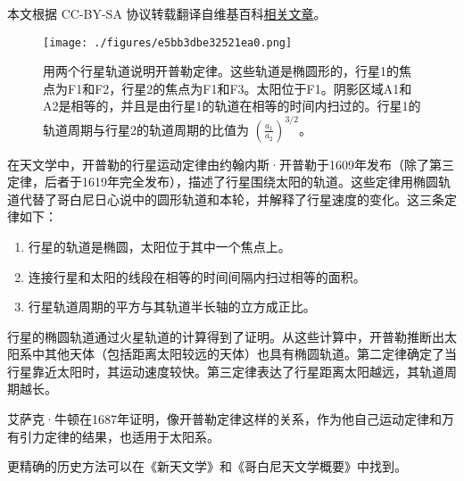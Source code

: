 
本文根据 CC-BY-SA 协议转载翻译自维基百科\href{https://en.wikipedia.org/wiki/Kepler\%27s_laws_of_planetary_motion}{相关文章}。

\begin{figure}[ht]
\centering
\texttt{[image: ./figures/e5bb3dbe32521ea0.png]}
\caption{用两个行星轨道说明开普勒定律。这些轨道是椭圆形的，行星1的焦点为F1和F2，行星2的焦点为F1和F3。太阳位于F1。阴影区域A1和A2是相等的，并且是由行星1的轨道在相等的时间内扫过的。行星1的轨道周期与行星2的轨道周期的比值为 \(\left(\frac{a_1}{a_2}\right)^{3/2}\)。} \label{fig_KPL_1}
\end{figure}
在天文学中，开普勒的行星运动定律由约翰内斯·开普勒于1609年发布（除了第三定律，后者于1619年完全发布），描述了行星围绕太阳的轨道。这些定律用椭圆轨道代替了哥白尼日心说中的圆形轨道和本轮，并解释了行星速度的变化。这三条定律如下：
\begin{enumerate}
\item 行星的轨道是椭圆，太阳位于其中一个焦点上。
\item 连接行星和太阳的线段在相等的时间间隔内扫过相等的面积。
\item 行星轨道周期的平方与其轨道半长轴的立方成正比。
\end{enumerate}
行星的椭圆轨道通过火星轨道的计算得到了证明。从这些计算中，开普勒推断出太阳系中其他天体（包括距离太阳较远的天体）也具有椭圆轨道。第二定律确定了当行星靠近太阳时，其运动速度较快。第三定律表达了行星距离太阳越远，其轨道周期越长。

艾萨克·牛顿在1687年证明，像开普勒定律这样的关系，作为他自己运动定律和万有引力定律的结果，也适用于太阳系。

更精确的历史方法可以在《新天文学》和《哥白尼天文学概要》中找到。
